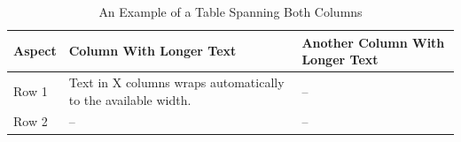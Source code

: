 \begin{table}[t]
  \centering
  \caption{An Example of a Table Spanning Both Columns}
  \label{tab:example_wide}
  \footnotesize
  \begin{tabularx}{\textwidth}{@{}l>{\raggedright\arraybackslash}X>{\raggedright\arraybackslash}X@{}}
    \toprule
    Aspect & Column With Longer Text & Another Column With Longer Text \\
    \midrule
    Row 1 & Text in X columns wraps automatically to the available width. & -- \\
    Row 2 & -- & -- \\
    \bottomrule
  \end{tabularx}
\end{table}
